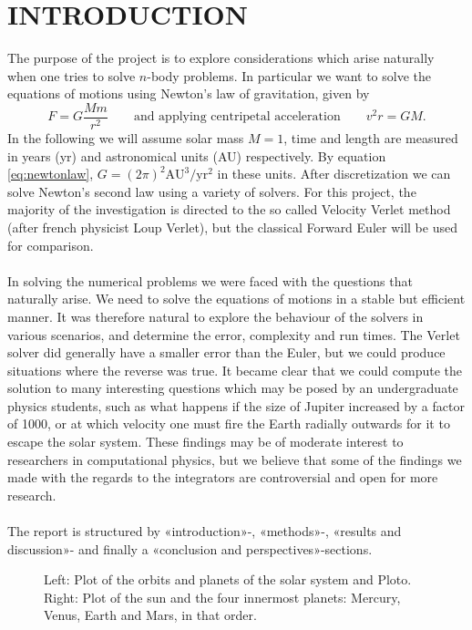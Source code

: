 \documentclass[11pt,english,a4paper]{article}
\begin{document}
\section*{\uppercase{Introduction}}
The purpose of the project is to explore considerations which arise naturally when one tries to solve $n$-body problems. In particular we want to solve the equations of motions using Newton's law of gravitation, given by
\begin{equation}
F = G\frac{Mm}{r^2} \qquad \text{and applying centripetal acceleration} \qquad v^2r = GM. \label{eq:newtonlaw}
\end{equation}
In the following we will assume solar mass $M = 1$, time and length are measured in years (yr) and astronomical units (AU) respectively. By equation \ref{eq:newtonlaw}, $G = (2 \pi)^2 \text{AU}^3/\text{yr}^2$ in these units. After discretization we can solve Newton's second law using a variety of solvers. For this project, the majority of the investigation is directed to the so called Velocity Verlet method (after french physicist Loup Verlet), but the classical Forward Euler will be used for comparison.\\
\\
In solving the numerical problems we were faced with the questions that naturally arise. We need to solve the equations of motions in a stable but efficient manner. It was therefore natural to explore the behaviour of the solvers in various scenarios, and determine the error, complexity and run times. The Verlet solver did generally have a smaller error than the Euler, but we could produce situations where the reverse was true. It became clear that we could compute the solution to many interesting questions which may be posed by an undergraduate physics students, such as what happens if the size of Jupiter increased by a factor of 1000, or at which velocity one must fire the Earth radially outwards for it to escape the solar system. These findings may be of moderate interest to researchers in computational physics, but we believe that some of the findings we made with the regards to the integrators are controversial and open for more research.
\\
\\
The report is structured by «introduction»-, «methods»-, «results and discussion»- and finally a «conclusion and perspectives»-sections.
\begin{figure}[!h]
%  
\caption{Left: Plot of the orbits and planets of the solar system and Ploto. Right: Plot of the sun and the four innermost planets: Mercury, Venus, Earth and Mars, in that order.}\label{fig:solarsystem}
\end{figure}
\end{document}
